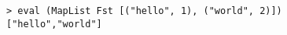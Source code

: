 \begin{repl}\begin{lstlisting}
> eval (MapList Fst [("hello", 1), ("world", 2)])
["hello","world"]\end{lstlisting}\end{repl}
